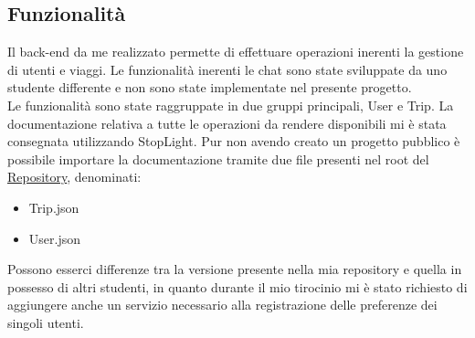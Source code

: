 \subsection{Funzionalità}
Il back-end da me realizzato permette di effettuare operazioni inerenti la gestione di utenti e viaggi.
Le funzionalità inerenti le chat sono state sviluppate da uno studente differente e non sono state implementate nel presente progetto.\\
Le funzionalità sono state raggruppate in due gruppi principali, User e Trip.
La documentazione relativa a tutte le operazioni da rendere disponibili mi è stata consegnata utilizzando StopLight.
Pur non avendo creato un progetto pubblico è possibile importare la documentazione tramite due file presenti nel root del \href{https://github.com/AlessandroTigani/ProgettoStageSyncLab}{Repository}, denominati:
\begin{itemize}
    \item Trip.json
    \item User.json
\end{itemize}
Possono esserci differenze tra la versione presente nella mia repository e quella in possesso di altri studenti, in quanto durante il mio tirocinio mi è stato richiesto di aggiungere anche un servizio necessario alla registrazione delle preferenze dei singoli utenti.
